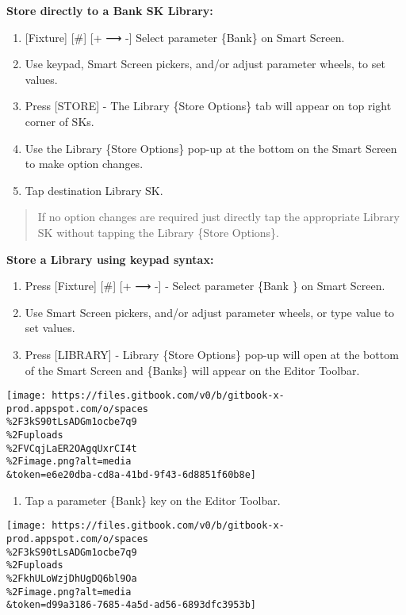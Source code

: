 \documentclass[
]{article}
\providecommand{\tightlist}{%
  \setlength{\itemsep}{0pt}\setlength{\parskip}{0pt}}
\begin{document}
\textbf{Store directly to a Bank SK Library:}

\begin{enumerate}
\def\labelenumi{\arabic{enumi}.}
\tightlist
\item
  {[}Fixture{]} {[}\#{]} {[}+ ⟶ -{]} Select parameter \{Bank\} on Smart Screen.
\item
  Use keypad, Smart Screen pickers, and/or adjust parameter wheels, to set values.
\item
  Press {[}STORE{]} - The Library \{Store Options\} tab will appear on top right corner of SKs.
\item
  Use the Library \{Store Options\} pop-up at the bottom on the Smart Screen to make option changes.
\item
  Tap destination Library SK.
\end{enumerate}

\begin{quote}
If no option changes are required just directly tap the appropriate Library SK without tapping the Library \{Store Options\}.
\end{quote}

\textbf{Store a Library using keypad syntax:}

\begin{enumerate}
\def\labelenumi{\arabic{enumi}.}
\item
  Press {[}Fixture{]} {[}\#{]} {[}+ ⟶ -{]} - Select parameter \{Bank \} on Smart Screen.
\item
  Use Smart Screen pickers, and/or adjust parameter wheels, or type value to set values.
\item
  Press {[}LIBRARY{]} - Library \{Store Options\} pop-up will open at the bottom of the Smart Screen and \{Banks\} will appear on the Editor Toolbar.
\end{enumerate}

\texttt{[image: https://files.gitbook.com/v0/b/gitbook-x-prod.appspot.com/o/spaces\\\%2F3kS90tLsADGm1ocbe7q9\\\%2Fuploads\\\%2FVCqjLaER2OAgqUxrCI4t\\\%2Fimage.png?alt=media\\\&token=e6e20dba-cd8a-41bd-9f43-6d8851f60b8e]}

\begin{enumerate}
\def\labelenumi{\arabic{enumi}.}
\setcounter{enumi}{3}
\tightlist
\item
  Tap a parameter \{Bank\} key on the Editor Toolbar.
\end{enumerate}

\texttt{[image: https://files.gitbook.com/v0/b/gitbook-x-prod.appspot.com/o/spaces\\\%2F3kS90tLsADGm1ocbe7q9\\\%2Fuploads\\\%2FkhULoWzjDhUgDQ6bl9Oa\\\%2Fimage.png?alt=media\\\&token=d99a3186-7685-4a5d-ad56-6893dfc3953b]}
\end{document}
